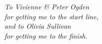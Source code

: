 
\null \vfill
\begin{flushright}
{\em To Vivienne \& Peter Ogden}\\
{\em for getting me to the start line,}\\
\vspace{0.25cm}
{\em and to Olivia Sullivan}\\
{\em for getting me to the finish.}
\end{flushright}
\null \vfill
